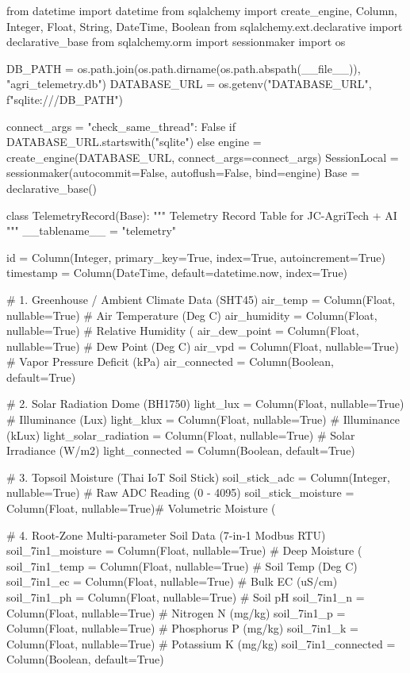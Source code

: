 \begin{pythonbox}
from datetime import datetime
from sqlalchemy import create_engine, Column, Integer, Float, String, DateTime, Boolean
from sqlalchemy.ext.declarative import declarative_base
from sqlalchemy.orm import sessionmaker
import os

DB_PATH = os.path.join(os.path.dirname(os.path.abspath(__file__)), "agri_telemetry.db")
DATABASE_URL = os.getenv("DATABASE_URL", f"sqlite:///{DB_PATH}")

connect_args = {"check_same_thread": False} if DATABASE_URL.startswith("sqlite") else {}
engine = create_engine(DATABASE_URL, connect_args=connect_args)
SessionLocal = sessionmaker(autocommit=False, autoflush=False, bind=engine)
Base = declarative_base()

class TelemetryRecord(Base):
    """
    Telemetry Record Table for JC-AgriTech + AI
    """
    __tablename__ = "telemetry"

    id = Column(Integer, primary_key=True, index=True, autoincrement=True)
    timestamp = Column(DateTime, default=datetime.now, index=True)
    
    # 1. Greenhouse / Ambient Climate Data (SHT45)
    air_temp = Column(Float, nullable=True)           # Air Temperature (Deg C)
    air_humidity = Column(Float, nullable=True)       # Relative Humidity (%
    air_dew_point = Column(Float, nullable=True)      # Dew Point (Deg C)
    air_vpd = Column(Float, nullable=True)            # Vapor Pressure Deficit (kPa)
    air_connected = Column(Boolean, default=True)

    # 2. Solar Radiation Dome (BH1750)
    light_lux = Column(Float, nullable=True)          # Illuminance (Lux)
    light_klux = Column(Float, nullable=True)         # Illuminance (kLux)
    light_solar_radiation = Column(Float, nullable=True) # Solar Irradiance (W/m2)
    light_connected = Column(Boolean, default=True)

    # 3. Topsoil Moisture (Thai IoT Soil Stick)
    soil_stick_adc = Column(Integer, nullable=True)   # Raw ADC Reading (0 - 4095)
    soil_stick_moisture = Column(Float, nullable=True)# Volumetric Moisture (%

    # 4. Root-Zone Multi-parameter Soil Data (7-in-1 Modbus RTU)
    soil_7in1_moisture = Column(Float, nullable=True) # Deep Moisture (%
    soil_7in1_temp = Column(Float, nullable=True)     # Soil Temp (Deg C)
    soil_7in1_ec = Column(Float, nullable=True)       # Bulk EC (uS/cm)
    soil_7in1_ph = Column(Float, nullable=True)       # Soil pH
    soil_7in1_n = Column(Float, nullable=True)        # Nitrogen N (mg/kg)
    soil_7in1_p = Column(Float, nullable=True)        # Phosphorus P (mg/kg)
    soil_7in1_k = Column(Float, nullable=True)        # Potassium K (mg/kg)
    soil_7in1_connected = Column(Boolean, default=True)


\end{pythonbox}
